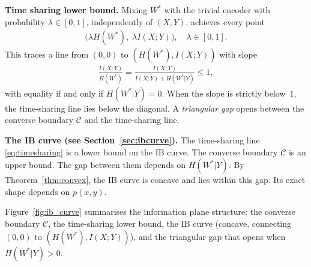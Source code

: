 \documentclass[11pt]{article}
\begin{document}
\medskip
\noindent\textbf{Time sharing lower bound.}
Mixing $W^*$ with the trivial encoder with probability $\lambda\in[0,1]$,
independently of $(X,Y)$, achieves every point
\begin{align}
    \bigl(\lambda H(W^*),\;\lambda I(X;Y)\bigr),
    \quad\lambda\in[0,1].
    \label{eq:timesharing}
\end{align}
This traces a line from $(0,0)$ to $(H(W^*),I(X;Y))$ with slope
\begin{align}
    \frac{I(X;Y)}{H(W^*)} = \frac{I(X;Y)}{I(X;Y)+H(W^*|Y)} \leq 1,
    \label{eq:ts_slope}
\end{align}
with equality if and only if $H(W^*|Y)=0$.
When the slope is strictly below~$1$, the time-sharing line lies below
the diagonal. A \textit{triangular gap} opens between the converse
boundary $\mathcal{C}$ and the time-sharing line.

\medskip
\noindent\textbf{The IB curve \textnormal{(see Section~\ref{sec:ibcurve})}.}
The time-sharing line \eqref{eq:timesharing} is a lower bound on the
IB curve. The converse boundary $\mathcal{C}$ is an upper bound.
The gap between them depends on $H(W^*|Y)$.
By Theorem~\ref{thm:convex}, the IB curve is concave and lies within
this gap. Its exact shape depends on $p(x,y)$.

\medskip
Figure~\ref{fig:ib_curve} summarises the information plane structure: the converse
boundary $\mathcal{C}$, the time-sharing lower bound, the IB curve
(concave, connecting $(0,0)$ to $(H(W^*),I(X;Y))$), and the
triangular gap that opens when $H(W^*|Y)>0$.
\end{document}
